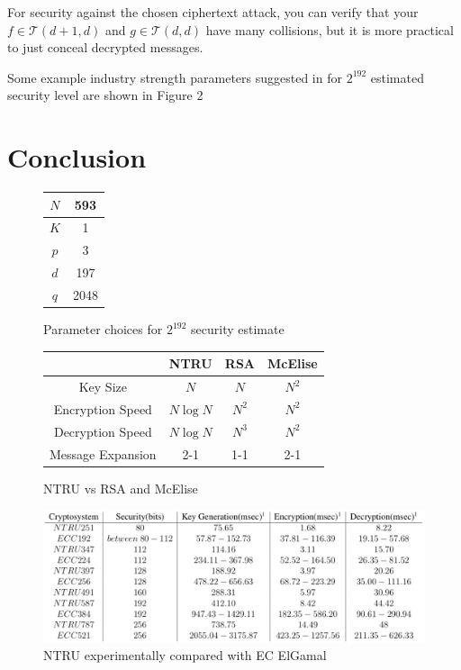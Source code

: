 \documentclass[12pt]{amsart}
\theoremstyle{definition}
\theoremstyle{remark}
\begin{document}
    For security against the chosen ciphertext attack, you can verify that your $f\in\mathcal{T}(d+1,d)$ and $g\in\mathcal{T}(d,d)$ have many collisions, but it is more practical to just conceal decrypted messages.
    
    Some example industry strength parameters suggested in \cite{Parameters} for $2^{192}$ estimated security level are shown in Figure 2

\section{Conclusion}

\begin{figure}
    \begin{tabular}{|c|c|}
\hline  $N$     &   593  \\\hline
        $K$     &   1    \\\hline
        $p$     &   3    \\\hline
        $d$     &   197  \\\hline
        $q$     &   2048 \\\hline
    \end{tabular}
    \caption{Parameter choices for $2^{192}$ security estimate \cite{Parameters}}
    \label{fig:exampleParam}
\end{figure}

\begin{figure}
    \begin{tabular}{|c|c|c|c|}
        \hline              &   NTRU        &   RSA     &   McElise \\\hline
        Key Size            &   $N$         &   $N$     &   $N^2$   \\
        Encryption Speed    &   $N\log N$   &   $N^2$   &   $N^2$   \\
        Decryption Speed    &   $N\log N$   &   $N^3$   &   $N^2$   \\
        Message Expansion   &   2-1         &   1-1     &   2-1     \\\hline
    \end{tabular}
    
    \caption{NTRU vs RSA and McElise \cite{NTRUpatent}}
    \label{fig:DirectComparison}
\end{figure}

\begin{figure}
    \centering
    \includegraphics[width=\textwidth]{NTRUvsECC.png}
    \caption{NTRU experimentally compared with EC ElGamal\cite{NguyenThesis}}
    \label{fig:4}
\end{figure}
\end{document}
